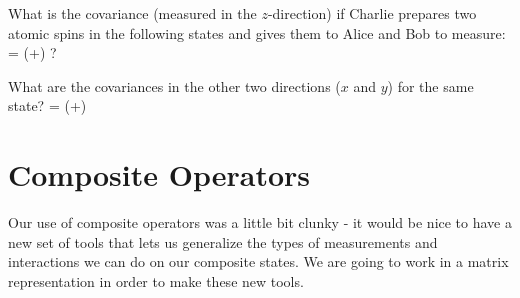 \begin{exercise}
What is the covariance (measured in the $z$-direction) if Charlie prepares two atomic spins in the following states and gives them to Alice and Bob to measure:
\beq
{} = \left(+\right) ?
\eeq
\end{exercise}

\begin{exercise}
What are the covariances in the other two directions ($x$ and $y$) for the same state?
\beq
{} = \left(+\right)
\eeq
\end{exercise}




\chapter{Composite Operators}
Our use of composite operators was a little bit clunky - it would be nice to have a new set of tools that lets us generalize the types of measurements and interactions we can do on our composite states. We are going to work in a matrix representation in order to make these new tools.

